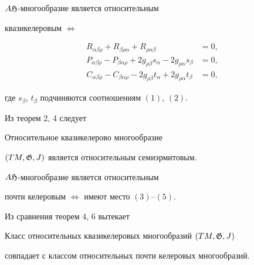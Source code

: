 \begin{thm} $A\frak H$-многообразие является относительным


квазикелеровым $\Longleftrightarrow$ 


\begin{align} 


R_{\alpha\beta\rho}+R_{\beta\rho\alpha}+ 


R_{\rho\alpha\beta}&=0,\\ 


P_{\alpha\beta\rho}-P_{\beta\alpha\rho}+ 


2g_{\rho\beta}s_\alpha-2g_{\rho\alpha}s_\beta&=0,\\ 


C_{\alpha\beta\rho}-C_{\beta\alpha\rho}- 


2g_{\rho\beta}t_\alpha+2g_{\rho\alpha}t_\beta&=0, 


\end{align} 


где $s_\beta$, $t_\beta$ подчиняются соотношениям $(1)$, $(2)$.  


\end{thm} 


 


Из теорем 2, 4 следует 


 


\begin{thm} Относительное квазикелерово многообразие  


$(TM,\frak G,J)$ является относительным семиэрмитовым.  


\end{thm} 


 


\begin{thm} $A\frak H$-многообразие является относительным  


почти келеровым $\Longleftrightarrow$ имеют место $(3)$--$(5)$.  


\end{thm} 


 


Из сравнения теорем 4, 6 вытекает 


 


\begin{thm} Класс относительных квазикелеровых многообразий $(TM,\frak 


G,J)$ 


совпадает с классом относительных почти келеровых многообразий.  


\end{thm} 


